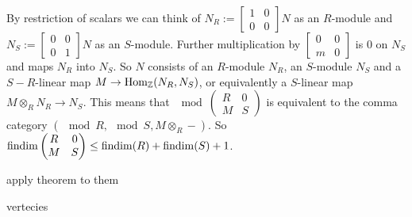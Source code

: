 By restriction of scalars we can think of $N_R:=\begin{bmatrix}
	1 & 0\\
	0 & 0
\end{bmatrix}N$ as an $R$-module and $N_S:=\begin{bmatrix}
0 & 0\\
0 & 1
\end{bmatrix}N$ as an $S$-module. Further multiplication by $\begin{bmatrix}
0 & 0\\
m & 0
\end{bmatrix}$ is 0 on $N_S$ and maps $N_R$ into $N_S$. So $N$ consists of an $R$-module $N_R$, an $S$-module $N_S$ and a $S-R$-linear map $M \to \operatorname{Hom}_\mathbb{Z}(N_R, N_S)$, or equivalently a $S$-linear map $M \otimes_R N_R \to N_S$. This means that $\mod \begin{pmatrix}
R & 0\\
M & S
\end{pmatrix}$ is equivalent to the comma category $(\mod R, \mod S, M \otimes_R -)$. So $\operatorname{findim}\begin{pmatrix}
R & 0\\
M & S
\end{pmatrix} \leq \operatorname{findim}(R) + \operatorname{findim}(S)+1$.

apply theorem to them

vertecies
